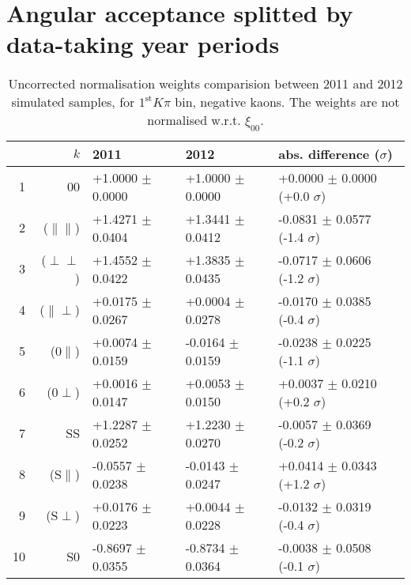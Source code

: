 \section{Angular acceptance splitted by data-taking year periods}\label{app:BsJpsiKst_angana_accper}
\begin{table}[hbtp]
  \caption{\small Uncorrected normalisation weights comparision between 2011 and 2012 simulated samples, for $1^{\text{st}}K\pi$ bin, negative kaons. The weights are not normalised w.r.t. $\xi_{00}$.}
  \center\footnotesize
  \begin{tabular}{r r l l l}      
  \multicolumn{2}{r}{$k$}            & 2011             & 2012              &   abs. difference ($\sigma$)        \\
   \hline  
  1  & 00                     & +1.0000 $\pm$  0.0000  &  +1.0000 $\pm$  0.0000  &  +0.0000 $\pm$  0.0000 (+0.0 $\sigma$) \\
  2  & ($\parallel\parallel$) & +1.4271 $\pm$  0.0404  &  +1.3441 $\pm$  0.0412  &  -0.0831 $\pm$  0.0577 (-1.4 $\sigma$) \\
  3  & ($\perp\perp$)         & +1.4552 $\pm$  0.0422  &  +1.3835 $\pm$  0.0435  &  -0.0717 $\pm$  0.0606 (-1.2 $\sigma$) \\
  4  & ($\parallel\perp$)     & +0.0175 $\pm$  0.0267  &  +0.0004 $\pm$  0.0278  &  -0.0170 $\pm$  0.0385 (-0.4 $\sigma$) \\
  5  & ($0\parallel$)         & +0.0074 $\pm$  0.0159  &  -0.0164 $\pm$  0.0159  &  -0.0238 $\pm$  0.0225 (-1.1 $\sigma$) \\
  6  & ($0\perp$)             & +0.0016 $\pm$  0.0147  &  +0.0053 $\pm$  0.0150  &  +0.0037 $\pm$  0.0210 (+0.2 $\sigma$) \\
  7  & SS                     & +1.2287 $\pm$  0.0252  &  +1.2230 $\pm$  0.0270  &  -0.0057 $\pm$  0.0369 (-0.2 $\sigma$) \\
  8  & (S$\parallel$)         & -0.0557 $\pm$  0.0238  &  -0.0143 $\pm$  0.0247  &  +0.0414 $\pm$  0.0343 (+1.2 $\sigma$) \\
  9  & (S$\perp$)             & +0.0176 $\pm$  0.0223  &  +0.0044 $\pm$  0.0228  &  -0.0132 $\pm$  0.0319 (-0.4 $\sigma$) \\
  10 & S0                    & -0.8697 $\pm$  0.0355  &  -0.8734 $\pm$  0.0364  &  -0.0038 $\pm$  0.0508 (-0.1 $\sigma$) \\
  \hline
  \end{tabular}
\end{table}
